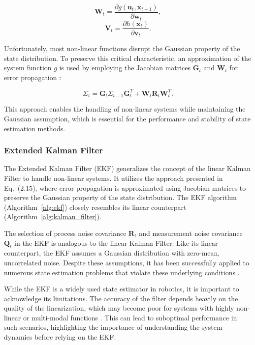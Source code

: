 \[
\mathbf{W}_t = \frac{\partial g(\mathbf{u}_t, \mathbf{x}_{t-1})}{\partial \mathbf{w}_t}, \tag{2.13}
\]
\[
\mathbf{V}_t = \frac{\partial h(\mathbf{x}_t)}{\partial \mathbf{v}_t}. \tag{2.14}
\]

Unfortunately, most non-linear functions disrupt the Gaussian property of the state distribution. To preserve this critical characteristic, an approximation of the system function \( g \) is used by employing the Jacobian matrices \( \mathbf{G}_t \) and \( \mathbf{W}_t \) for error propagation \citep{welch2006kalman}:

\[
\Sigma_t = \mathbf{G}_t \Sigma_{t-1} \mathbf{G}_t^T + \mathbf{W}_t \mathbf{R}_t \mathbf{W}_t^T. \tag{2.15}
\]

This approach enables the handling of non-linear systems while maintaining the Gaussian assumption, which is essential for the performance and stability of state estimation methods.

\subsubsection{Extended Kalman Filter}


The Extended Kalman Filter (EKF) generalizes the concept of the linear Kalman Filter to handle non-linear systems. It utilizes the approach presented in Eq.~(2.15), where error propagation is approximated using Jacobian matrices to preserve the Gaussian property of the state distribution. The EKF algorithm (Algorithm~\ref{alg:ekf}) closely resembles its linear counterpart (Algorithm~\ref{alg:kalman_filter}).



The selection of process noise covariance \( \mathbf{R}_t \) and measurement noise covariance \( \mathbf{Q}_t \) in the EKF is analogous to the linear Kalman Filter. Like its linear counterpart, the EKF assumes a Gaussian distribution with zero-mean, uncorrelated noise. Despite these assumptions, it has been successfully applied to numerous state estimation problems that violate these underlying conditions \citep{thrun2000probabilistic}.

While the EKF is a widely used state estimator in robotics, it is important to acknowledge its limitations. The accuracy of the filter depends heavily on the quality of the linearization, which may become poor for systems with highly non-linear or multi-modal functions \citep{thrun2000probabilistic}. This can lead to suboptimal performance in such scenarios, highlighting the importance of understanding the system dynamics before relying on the EKF.